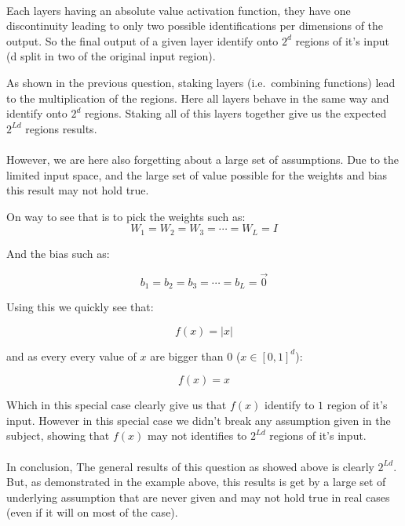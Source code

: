 \paragraph{}
Each layers having an absolute value activation function, they have one discontinuity leading to only two possible 
identifications per dimensions of the output.
So the final output of a given layer identify onto $2^d$ regions of it's input (d split in two of the original input 
region).

As shown in the previous question, staking layers (i.e.\ combining functions) lead to the multiplication of the regions.
Here all layers behave in the same way and identify onto $2^d$ regions.
Staking all of this layers together give us the expected $2^{Ld}$ regions results.

\paragraph{}
However, we are here also forgetting about a large set of assumptions.
Due to the limited input space, and the large set of value possible for the weights and bias this result may not hold 
true.

On way to see that is to pick the weights such as:
\[
    W_1 = W_2 = W_3 = \cdots = W_L = I
\]

And the bias such as:

\[
    b_1 = b_2 = b_3 = \cdots = b_L = \vec{0}
\]

Using this we quickly see that:

\[
    f(x) = | x |
\]

and as every every value of $x$ are bigger than $0$ ($x \in [0,1]^d$):

\[
    f(x) = x
\]

Which in this special case clearly give us that $f(x)$ identify to $1$ region of it's input.
However in this special case we didn't break any assumption given in the subject, showing that $f(x)$ may not identifies
to $2^{Ld}$ regions of it's input.

\paragraph{}
In conclusion, The general results of this question as showed above is clearly $2^{Ld}$.
But, as demonstrated in the example above, this results is get by a large set of underlying assumption that are never
given and may not hold true in real cases (even if it will on most of the case).


